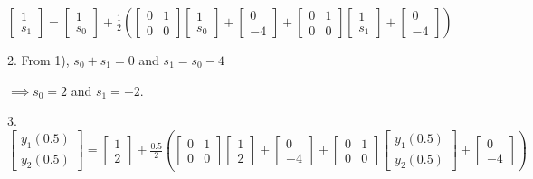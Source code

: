 \documentclass[a4paper, 11pt]{article}
\begin{document}
	$\left[\begin{array}{c}
	1\\
	s_{1}
	\end{array}\right]=\left[\begin{array}{c}
	1\\
	s_{0}
	\end{array}\right]+\frac{1}{2}\left(\left[\begin{array}{cc}
	0 & 1\\
	0 & 0
	\end{array}\right]\left[\begin{array}{c}
	1\\
	s_{0}
	\end{array}\right]+\left[\begin{array}{c}
	0\\
	-4
	\end{array}\right]+\left[\begin{array}{cc}
	0 & 1\\
	0 & 0
	\end{array}\right]\left[\begin{array}{c}
	1\\
	s_{1}
	\end{array}\right]+\left[\begin{array}{c}
	0\\
	-4
	\end{array}\right]\right)$
	
	2. From 1), $s_{0}+s_{1}=0$ and $s_{1}=s_{0}-4$
	
	$\implies s_{0}=2$ and $s_{1}=-2$.
	
	3. $\left[\begin{array}{c}
	y_{1}(0.5)\\
	y_{2}(0.5)
	\end{array}\right]=\left[\begin{array}{c}
	1\\
	2
	\end{array}\right]+\frac{0.5}{2}\left(\left[\begin{array}{cc}
	0 & 1\\
	0 & 0
	\end{array}\right]\left[\begin{array}{c}
	1\\
	2
	\end{array}\right]+\left[\begin{array}{c}
	0\\
	-4
	\end{array}\right]+\left[\begin{array}{cc}
	0 & 1\\
	0 & 0
	\end{array}\right]\left[\begin{array}{c}
	y_{1}(0.5)\\
	y_{2}(0.5)
	\end{array}\right]+\left[\begin{array}{c}
	0\\
	-4
	\end{array}\right]\right)$
	
\end{document}

